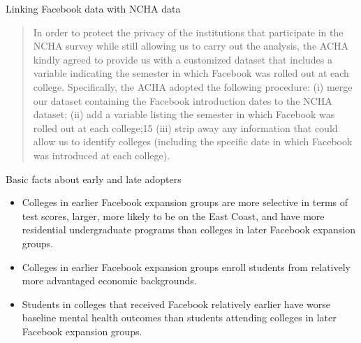 \documentclass{beamer}
\begin{document}
\begin{frame}{Linking Facebook data with NCHA data}

\begin{quote}
In order to protect the privacy of the institutions that participate in the NCHA survey while still allowing us to carry out the analysis, the ACHA kindly agreed to provide us with a customized dataset that includes a variable indicating the semester in which Facebook was rolled out at each college. Specifically, the ACHA adopted the following procedure: (i) merge our dataset containing the Facebook introduction dates to the NCHA dataset; (ii) add a variable listing the semester in which Facebook was rolled out at each college;15 (iii) strip away any information that could allow us to identify colleges (including the specific date in which Facebook was introduced at each college).
\end{quote}

\end{frame}

\begin{frame}{Basic facts about early and late adopters}

\begin{itemize}
\item Colleges in earlier Facebook expansion groups are more selective in terms of test scores, larger, more likely to be on the East Coast, and have more residential undergraduate programs than colleges in later Facebook expansion groups. 

\item Colleges in earlier Facebook expansion groups enroll students from relatively more advantaged economic backgrounds. 

\item Students in colleges that received Facebook relatively earlier have worse baseline mental health outcomes than students attending colleges in later Facebook expansion groups. 


\end{itemize}

\end{frame}
\end{document}

